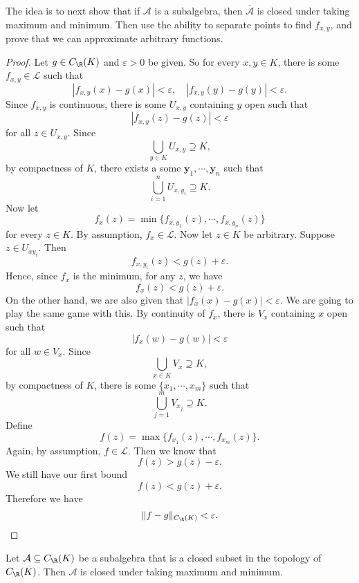 \documentclass[a4paper]{article}
\begin{document}
The idea is to next show that if $\mathcal{A}$ is a subalgebra, then $\bar{\mathcal{A}}$ is closed under taking maximum and minimum. Then use the ability to separate points to find $f_{x, y}$, and prove that we can approximate arbitrary functions.

\begin{proof}
  Let $g \in C_\R(K)$ and $\varepsilon > 0$ be given. So for every $x, y \in K$, there is some $f_{x, y} \in \mathcal{L}$ such that
  \[
    |f_{x, y}(x) - g(x)| < \varepsilon,\quad |f_{x, y}(y) - g(y)| < \varepsilon.
  \]
  Since $f_{x, y}$ is continuous, there is some $U_{x, y}$ containing $y$ open such that
  \[
    |f_{x, y}(z) - g(z)| < \varepsilon
  \]
  for all $z \in U_{x, y}$. Since
  \[
    \bigcup_{y \in K} U_{x, y} \supseteq K,
  \]
  by compactness of $K$, there exists a some $\mathbf{y}_1, \cdots, \mathbf{y}_n$ such that
  \[
    \bigcup_{i = 1}^n U_{x, y_i}\supseteq K.
  \]
  Now let
  \[
    f_x(z) = \min\{f_{x, y_1}(z), \cdots, f_{x, y_n}(z)\}
  \]
  for every $z \in K$. By assumption, $f_x \in \mathcal{L}$. Now let $z \in K$ be arbitrary. Suppose $z \in U_{x y_i}$. Then
  \[
    f_{x, y_i}(z) < g(z) + \varepsilon.
  \]
  Hence, since $f_x$ is the minimum, for any $z$, we have
  \[
    f_x(z) < g(z) + \varepsilon.
  \]
  On the other hand, we are also given that $|f_x(x) - g(x)| < \varepsilon$. We are going to play the same game with this. By continuity of $f_x$, there is $V_x$ containing $x$ open such that
  \[
    |f_x(w) - g(w)| < \varepsilon
  \]
  for all $w \in V_x$. Since
  \[
    \bigcup_{x\in K} V_x \supseteq K,
  \]
  by compactness of $K$, there is some $\{x_1, \cdots, x_m\}$ such that
  \[
    \bigcup_{j = 1}^m V_{x_j} \supseteq K.
  \]
  Define
  \[
    f(z) = \max\{f_{x_1}(z), \cdots, f_{x_m}(z)\}.
  \]
  Again, by assumption, $f \in \mathcal{L}$. Then we know that
  \[
    f(z) > g(z) - \varepsilon.
  \]
  We still have our first bound
  \[
    f(z) < g(z) + \varepsilon.
  \]
  Therefore we have
  \[
    \|f - g\|_{C_\R (K)} < \varepsilon.
  \]
\end{proof}

\begin{lemma}
  Let $\mathcal{A}\subseteq C_\R(K)$ be a subalgebra that is a closed subset in the topology of $C_\R(K)$. Then $\mathcal{A}$ is closed under taking maximum and minimum.
\end{lemma}
\end{document}
